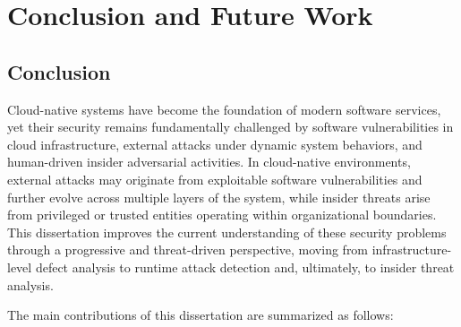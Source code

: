 \chapter{Conclusion and Future Work}

\section{Conclusion}

Cloud-native systems have become the foundation of modern software services, yet their security remains fundamentally challenged by software vulnerabilities in cloud infrastructure, external attacks under dynamic system behaviors, and human-driven insider adversarial activities. In cloud-native environments, external attacks may originate from exploitable software vulnerabilities and further evolve across multiple layers of the system, while insider threats arise from privileged or trusted entities operating within organizational boundaries. This dissertation improves the current understanding of these security problems through a progressive and threat-driven perspective, moving from infrastructure-level defect analysis to runtime attack detection and, ultimately, to insider threat analysis.

The main contributions of this dissertation are summarized as follows:

